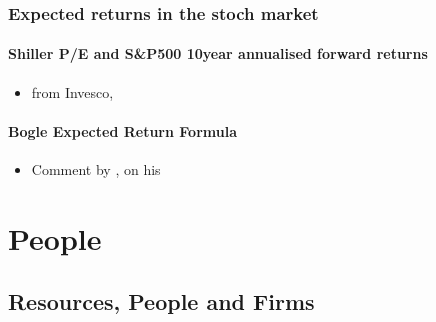 \documentclass[letterpaper,10pt,english]{jupyterBook}
\begin{document}
\section{Expected returns in the stoch market}
\label{\detokenize{ch/extra/euristhics:expected-returns-in-the-stoch-market}}

\subsection{Shiller P/E and S\&P500 10\sphinxhyphen{}year annualised forward returns}
\label{\detokenize{ch/extra/euristhics:shiller-p-e-and-s-p500-10-year-annualised-forward-returns}}\begin{itemize}
\item {} 
\sphinxAtStartPar
from Invesco, 

\end{itemize}


\subsection{Bogle Expected Return Formula}
\label{\detokenize{ch/extra/euristhics:bogle-expected-return-formula}}\begin{itemize}
\item {} 
\sphinxAtStartPar
Comment by {\hyperref[\detokenize{ch/people/list:fin-edu-resources-people-carlson}]{}}, on his 

\end{itemize}

\sphinxstepscope


\part{People}

\sphinxstepscope


\chapter{Resources, People and Firms}
\label{\detokenize{ch/people/list:resources-people-and-firms}}\label{\detokenize{ch/people/list:fin-edu-resources-list}}\label{\detokenize{ch/people/list::doc}}
\end{document}
